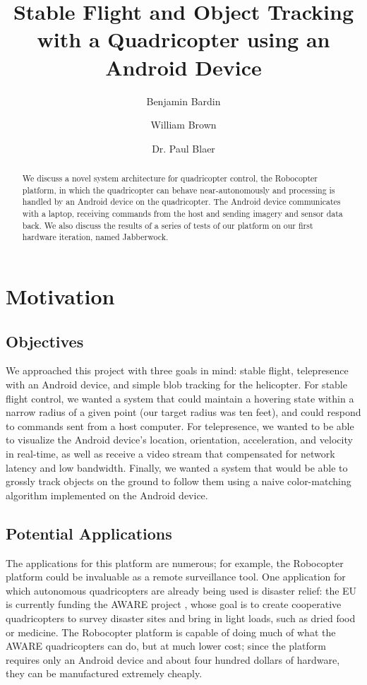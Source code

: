 
\title{Stable Flight and Object Tracking with a Quadricopter using an
  Android Device}
\author{Benjamin Bardin \and William Brown 
  \and Dr. Paul Blaer}


\todolist

\maketitle

\begin{abstract}
  We discuss a novel system architecture for quadricopter control, the
  Robocopter platform, in which the quadricopter can behave
  near-autonomously and processing is handled by an Android device on
  the quadricopter. The Android device communicates with a laptop,
  receiving commands from the host and sending imagery and sensor data
  back. We also discuss the results of a series of tests of our
  platform on our first hardware iteration, named Jabberwock.
\end{abstract}
\tableofcontents

\section{Motivation}
\subsection{Objectives}
We approached this project with three goals in mind: stable flight,
telepresence with an Android device, and simple blob tracking for the
helicopter. For stable flight control, we wanted a system that could
maintain a hovering state within a narrow radius of a given point (our
target radius was ten feet), and could respond to commands sent from a
host computer. For telepresence, we wanted to be able to visualize the
Android device's location, orientation, acceleration, and velocity in
real-time, as well as receive a video stream that compensated for
network latency and low bandwidth. Finally, we wanted a system that
would be able to grossly track objects on the ground to follow them
using a naive color-matching algorithm implemented on the Android
device.

\subsection{Potential Applications}
The applications for this platform are numerous; for example, the
Robocopter platform could be invaluable as a remote surveillance
tool. One application for which autonomous quadricopters are already
being used is disaster relief: the EU is currently funding the AWARE
project \citep{aware}, whose goal is to create cooperative
quadricopters to survey disaster sites and bring in light loads, such
as dried food or medicine. The Robocopter platform is capable of doing
much of what the AWARE quadricopters can do, but at much lower cost;
since the platform requires only an Android device and about four
hundred dollars of hardware, they can be manufactured extremely
cheaply.

